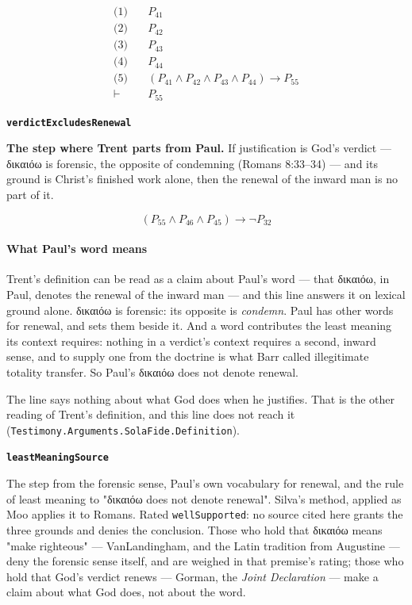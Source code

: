 \documentclass[11pt]{article}
\begin{document}
\begin{align*}
  \text{(1)} \quad & P_{41} \\
  \text{(2)} \quad & P_{42} \\
  \text{(3)} \quad & P_{43} \\
  \text{(4)} \quad & P_{44} \\
  \text{(5)} \quad & (P_{41} \land P_{42} \land P_{43} \land P_{44}) \rightarrow P_{55} \\
  \vdash \quad & P_{55}
\end{align*}
\par\medskip\noindent\textbf{\texttt{verdict\allowbreak{}Excludes\allowbreak{}Renewal}}\par\nobreak\noindent
\textbf{The step where Trent parts from Paul.} If justification is God's verdict — δικαιόω is forensic, the opposite of condemning (Romans 8:33–34) — and its ground is Christ's finished work alone, then the renewal of the inward man is no part of it.

\[(P_{55} \land P_{46} \land P_{45}) \rightarrow \lnot P_{32}\]
\paragraph*{What Paul's word means}
\leavevmode\par
Trent's definition can be read as a claim about Paul's word — that δικαιόω, in Paul, denotes the renewal of the inward man — and this line answers it on lexical ground alone. δικαιόω is forensic: its opposite is \emph{condemn}. Paul has other words for renewal, and sets them beside it. And a word contributes the least meaning its context requires: nothing in a verdict's context requires a second, inward sense, and to supply one from the doctrine is what Barr called illegitimate totality transfer. So Paul's δικαιόω does not denote renewal.

The line says nothing about what God does when he justifies. That is the other reading of Trent's definition, and this line does not reach it (\texttt{Testimony.Arguments.Sola\allowbreak{}Fide.Definition}).

\par\medskip\noindent\textbf{\texttt{least\allowbreak{}Meaning\allowbreak{}Source}}\par\nobreak\noindent
The step from the forensic sense, Paul's own vocabulary for renewal, and the rule of least meaning to "δικαιόω does not denote renewal". Silva's method, applied as Moo applies it to Romans. Rated \texttt{well\allowbreak{}Supported}: no source cited here grants the three grounds and denies the conclusion. Those who hold that δικαιόω means "make righteous" — VanLandingham, and the Latin tradition from Augustine — deny the forensic sense itself, and are weighed in that premise's rating; those who hold that God's verdict renews — Gorman, the \emph{Joint Declaration} — make a claim about what God does, not about the word.
\end{document}
